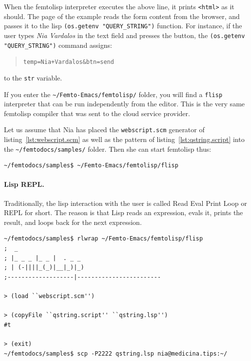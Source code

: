 \documentclass[a4paper,12pt]{book}
\begin{document}
When the femtolisp interpreter executes
the above line, it prints \verb|<html>|
as it should. The page of the example
reads the form content from the browser,
and passes it to
the lisp \verb|(os.getenv "QUERY_STRING")|
function. For instance, if the user
types {\em Nia Vardalos} in the text field
and presses the  button,
the  \verb|(os.getenv "QUERY_STRING")| command
assigns:
\begin{quote}
\verb|temp=Nia+Vardalos&btn=send|
\end{quote}
to the \verb|str| variable.


If you enter the \verb|~/Femto-Emacs/femtolisp/|
folder, you will find a \verb|flisp|
interpreter that can be run independently
from the editor. This is the very same
femtolisp compiler that was sent to
the cloud service provider.

Let us assume that Nia has placed the
\verb|webscript.scm| generator of
listing~\ref{lst:webscript.scm}
as well as the pattern of
listing~\ref{lst:qstring.script}
into the \verb|~/femtodocs/samples/| folder.
Then she can start femtolisp thus:
\begin{verbatim}
~/femtodocs/samples$ ~/Femto-Emacs/femtolisp/flisp
\end{verbatim}

\paragraph{Lisp REPL.} Traditionally, the lisp
interaction with the user is called Read Eval
Print Loop or REPL for short. The reason is that
Lisp reads an expression, evals it, prints the
result, and loops back for the next expression.

\begin{Verbatim}[fontsize=\small,
frame=single,
framerule=0.5mm]
~/femtodocs/samples$ rlwrap ~/Femto-Emacs/femtolisp/flisp
;  _
; |_ _ _ |_ _ |  . _ _
; | (-||||_(_)|__|_)|_)
;-------------------|------------------------

> (load ``webscript.scm'')

> (copyFile ``qstring.script'' ``qstring.lsp'')
#t

> (exit)
~/femtodocs/samples$ scp -P2222 qstring.lsp nia@medicina.tips:~/
\end{Verbatim}
\end{document}
